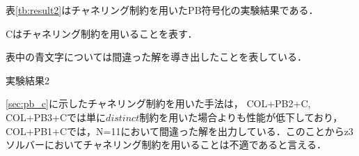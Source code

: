表\ref{tb:result2}はチャネリング制約を用いたPB符号化の実験結果である．

Cはチャネリング制約を用いることを表す．

表中の青文字については間違った解を導き出したことを表している．
\begin{table}[htb]
    \caption{実験結果2}
{\tiny \label{tb:result2}}
\end{table}
\ref{sec:pb_c}に示したチャネリング制約を用いた手法は，
COL+PB2+C, COL+PB3+Cでは単に$distinct$制約を用いた場合よりも性能が低下しており，
COL+PB1+Cでは，N=11において間違った解を出力している．このことからz3ソルバーにおいてチャネリング制約を用いることは不適であると言える．



